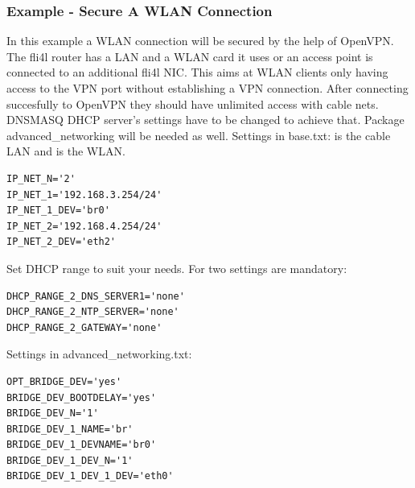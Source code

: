 \subsubsection{Example - Secure A WLAN Connection}

In this example a WLAN connection will be secured by the help of OpenVPN.
The fli4l router has a LAN and a WLAN card it uses or an access point is 
connected to an additional fli4l NIC. This aims at WLAN clients only 
having access to the VPN port without establishing a VPN connection. 
After connecting succesfully to OpenVPN they should have unlimited 
access with cable nets. DNSMASQ DHCP server's settings have to be 
changed to achieve that. Package advanced\_networking will be needed 
as well. Settings in base.txt:
 is the cable LAN and  is the WLAN.
\begin{example}
\begin{verbatim}
IP_NET_N='2'
IP_NET_1='192.168.3.254/24'
IP_NET_1_DEV='br0'
IP_NET_2='192.168.4.254/24'
IP_NET_2_DEV='eth2'
\end{verbatim}
\end{example}

Set DHCP range to suit your needs.  For 
two settings are mandatory:

\begin{example}
\begin{verbatim}
DHCP_RANGE_2_DNS_SERVER1='none'  
DHCP_RANGE_2_NTP_SERVER='none'  
DHCP_RANGE_2_GATEWAY='none' 
\end{verbatim}
\end{example}

Settings in advanced\_networking.txt:
\begin{example}
\begin{verbatim}
OPT_BRIDGE_DEV='yes'
BRIDGE_DEV_BOOTDELAY='yes'
BRIDGE_DEV_N='1'
BRIDGE_DEV_1_NAME='br'
BRIDGE_DEV_1_DEVNAME='br0'
BRIDGE_DEV_1_DEV_N='1'
BRIDGE_DEV_1_DEV_1_DEV='eth0'
\end{verbatim}
\end{example}

